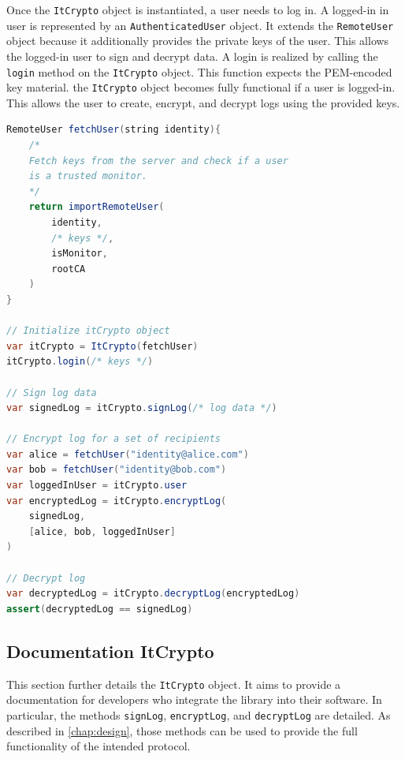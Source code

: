 \documentclass[../main.tex]{subfiles}
\begin{document}
Once the \verb|ItCrypto| object is instantiated, a user needs to log in.
A logged-in in user is represented by an \verb|AuthenticatedUser| object.
It extends the \verb|RemoteUser| object because it additionally provides the private keys of the user.
This allows the logged-in user to sign and decrypt data.
A login is realized by calling the \verb|login| method on the \verb|ItCrypto| object.
This function expects the PEM-encoded key material.
the \verb|ItCrypto| object becomes fully functional if a user is logged-in.
This allows the user to create, encrypt, and decrypt logs using the provided keys.

\begin{lstlisting}[basicstyle=\small, label=lst:pseudocode,float,floatplacement=tbp, language=Java, caption={[Pseudocode library usage]Pseudocode of creating, encrypting, and decrypting logs using the provided libraries.}, morekeywords={RemoteUser, var, assert}, commentstyle=\color{codegreen}]
RemoteUser fetchUser(string identity){
    /*
    Fetch keys from the server and check if a user 
    is a trusted monitor.
    */
    return importRemoteUser(
        identity,
        /* keys */, 
        isMonitor, 
        rootCA
    )
}

// Initialize itCrypto object
var itCrypto = ItCrypto(fetchUser)
itCrypto.login(/* keys */)

// Sign log data
var signedLog = itCrypto.signLog(/* log data */)

// Encrypt log for a set of recipients
var alice = fetchUser("identity@alice.com")
var bob = fetchUser("identity@bob.com")
var loggedInUser = itCrypto.user
var encryptedLog = itCrypto.encryptLog(
    signedLog, 
    [alice, bob, loggedInUser]
)

// Decrypt log
var decryptedLog = itCrypto.decryptLog(encryptedLog)
assert(decryptedLog == signedLog)
\end{lstlisting}

\subsection{Documentation ItCrypto}
This section further details the \verb|ItCrypto| object.
It aims to provide a documentation for developers who integrate the library into their software.
In particular, the methods \verb|signLog|, \verb|encryptLog|, and \verb|decryptLog| are detailed.
As described in \cref{chap:design}, those methods can be used to provide the full functionality of the intended protocol.
\end{document}

